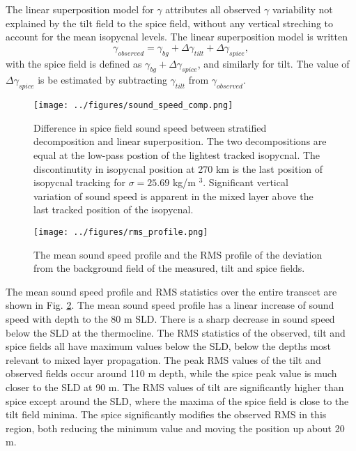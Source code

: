 \documentclass[preprint,NumberedRefs]{JASA}
\begin{document}
The linear superposition model for $\gamma$ attributes all observed $\gamma$ variability not explained by the tilt field to the spice field, without any vertical streching to account for the mean isopycnal levels. The linear superposition model is written
\begin{equation}
    \gamma_{observed} = \gamma_{bg} + \Delta \gamma_{tilt} + \Delta \gamma_{spice},
\end{equation}
with the spice field is defined as $\gamma_{bg} + \Delta \gamma_{spice}$, and similarly for tilt. The value of $\Delta \gamma_{spice}$ is be estimated by subtracting $\gamma_{tilt}$ from $\gamma_{observed}$.

\begin{figure}
\texttt{[image: ../figures/sound\_speed\_comp.png]}
    \caption{\label{fig:c_diff}{Difference in spice field sound speed between stratified decomposition and linear superposition. The two decompositions are equal at the low-pass postion of the lightest tracked isopycnal. The discontinutity in isopycnal position at 270 km is the last position of isopycnal tracking for $\sigma=25.69$ kg/m $^3$. Significant vertical variation of sound speed is apparent in the mixed layer above the last tracked position of the isopycnal.}}
\end{figure}


\begin{figure}
\texttt{[image: ../figures/rms\_profile.png]}
    \caption{\label{fig:c_rms}{The mean sound speed profile and the RMS profile of the deviation from the background field of the measured, tilt and spice fields. }}
\end{figure}

The mean sound speed profile and RMS statistics over the entire transcet are shown in Fig. \ref{fig:c_rms}. The mean sound speed profile has a linear increase of sound speed with depth to the 80 m SLD. There is a sharp decrease in sound speed below the SLD at the thermocline. The RMS statistics of the observed, tilt and spice fields all have maximum values below the SLD, below the depths most relevant to mixed layer propagation. The peak RMS values of the tilt and observed fields occur around 110 m depth, while the spice peak value is much closer to the SLD at 90 m. The RMS values of tilt are significantly higher than spice except around the SLD, where the maxima of the spice field is close to the tilt field minima. The spice significantly modifies the observed RMS  in this region, both reducing the minimum value and moving the position up about 20 m.
\end{document}
